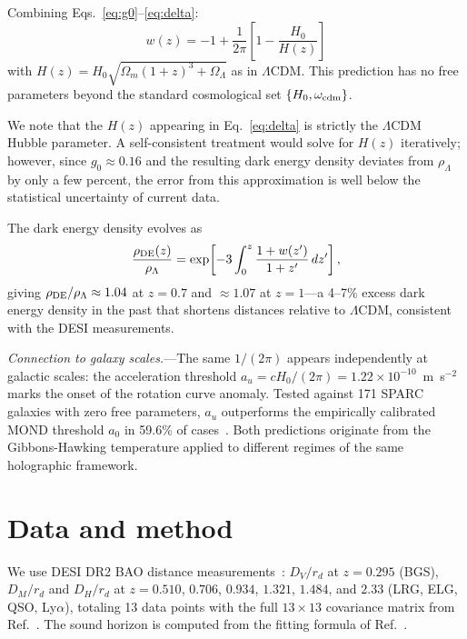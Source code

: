 \documentclass[aps,prl,twocolumn,showpacs,preprintnumbers,amsmath,amssymb,superscriptaddress]{revtex4-2}
\begin{document}
Combining Eqs.~\eqref{eq:g0}--\eqref{eq:delta}:
\begin{equation}
\boxed{w(z) = -1 + \frac{1}{2\pi}\left[1 - \frac{H_0}{H(z)}\right]}
\label{eq:wz}
\end{equation}
with $H(z) = H_0\sqrt{\Omega_m(1+z)^3 + \Omega_\Lambda}$ as in 
$\Lambda$CDM. This prediction has no free parameters beyond 
the standard cosmological set $\{H_0, \omega_{\rm cdm}\}$.

We note that the $H(z)$ appearing in Eq.~\eqref{eq:delta} is 
strictly the $\Lambda$CDM Hubble parameter. A self-consistent 
treatment would solve for $H(z)$ iteratively; however, since 
$g_0 \approx 0.16$ and the resulting dark energy density deviates 
from $\rho_\Lambda$ by only a few percent, the error from this 
approximation is well below the statistical uncertainty of 
current data.

The dark energy density evolves as
\begin{equation}
\frac{\rho_{\rm DE}(z)}{\rho_\Lambda} = 
\exp\!\left[-3\int_0^z \frac{1+w(z')}{1+z'}\,dz'\right],
\label{eq:rhoDE}
\end{equation}
giving $\rho_{\rm DE}/\rho_\Lambda \approx 1.04$ at $z=0.7$ and 
$\approx 1.07$ at $z=1$---a 4--7\% excess dark energy density in 
the past that shortens distances relative to $\Lambda$CDM, consistent 
with the DESI measurements.

\textit{Connection to galaxy scales.}---The same $1/(2\pi)$ appears 
independently at galactic scales: the acceleration threshold 
$a_u = cH_0/(2\pi) = 1.22\times10^{-10}$~m~s$^{-2}$ marks the 
onset of the rotation curve anomaly. Tested against 171 SPARC galaxies 
with zero free parameters, $a_u$ outperforms the empirically calibrated 
MOND threshold $a_0$ in 59.6\% of cases~\cite{Paper1}. Both predictions 
originate from the Gibbons-Hawking temperature applied to different 
regimes of the same holographic framework.

\section{Data and method}

We use DESI DR2 BAO distance measurements~\cite{DESI_DR2}: 
$D_V/r_d$ at $z=0.295$ (BGS), $D_M/r_d$ and $D_H/r_d$ at 
$z = 0.510$, $0.706$, $0.934$, $1.321$, $1.484$, and $2.33$ 
(LRG, ELG, QSO, Ly$\alpha$), totaling 13 data points with the 
full $13 \times 13$ covariance matrix from 
Ref.~\cite{CobayaSampler}. The sound horizon is computed from 
the fitting formula of Ref.~\cite{Aubourg2015}.
\end{document}
